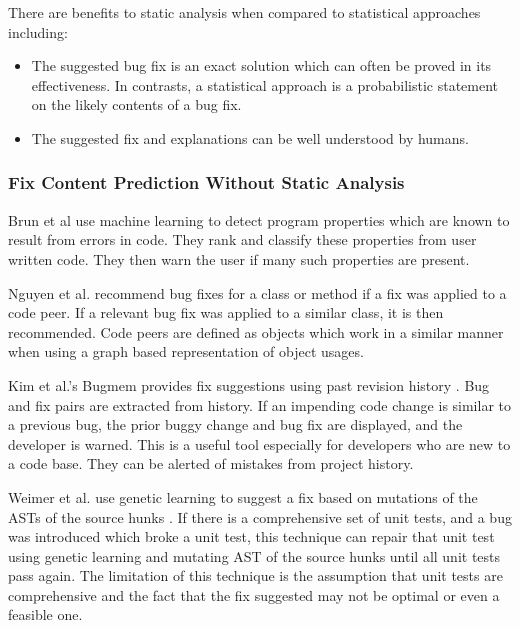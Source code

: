 \documentclass[conference]{IEEEtran}
\begin{document}
There are benefits to static analysis when compared to statistical
approaches including:

\begin{itemize}

\item The suggested bug fix is an exact solution which can often be proved
in its effectiveness. In contrasts, a statistical approach is a probabilistic
statement on the likely contents of a bug fix.

\item The suggested fix and explanations can be well understood by humans.

\end{itemize}

\subsubsection{Fix Content Prediction Without Static Analysis}
Brun et al \cite{Brun2004p1} use machine learning to detect program properties
which are known to result from errors in code. They rank and classify these properties from user written code. They then warn the user if many
such properties are present.

Nguyen et al. \cite{nguyen2010recurring} recommend bug fixes for a class or method if a fix was applied to a code peer. If a relevant bug fix was applied to a similar class, it is then recommended. Code peers are defined as objects which work in a similar manner when using a graph based representation of object usages.

Kim et al.'s Bugmem provides fix suggestions using past revision history \cite{Kim2006} . Bug and fix pairs are extracted from history. If an impending code change is similar to a previous bug, the prior buggy change and bug fix are displayed, and the developer is warned. This is a useful tool especially for developers who are new to a code base. They can be alerted of mistakes from project history. 

Weimer et al. use genetic learning to suggest a fix based on mutations of the ASTs of the source hunks \cite{Weimer:2009:AFP:1555001.1555051}. If there is a
comprehensive set of unit tests, and a bug was introduced which broke a unit test, this technique can repair that unit test using genetic
learning and mutating AST of the source hunks until all unit tests pass again. The limitation of this technique is the assumption that unit
tests are comprehensive and the fact that the fix suggested may not be optimal or even a feasible one.
\end{document}
